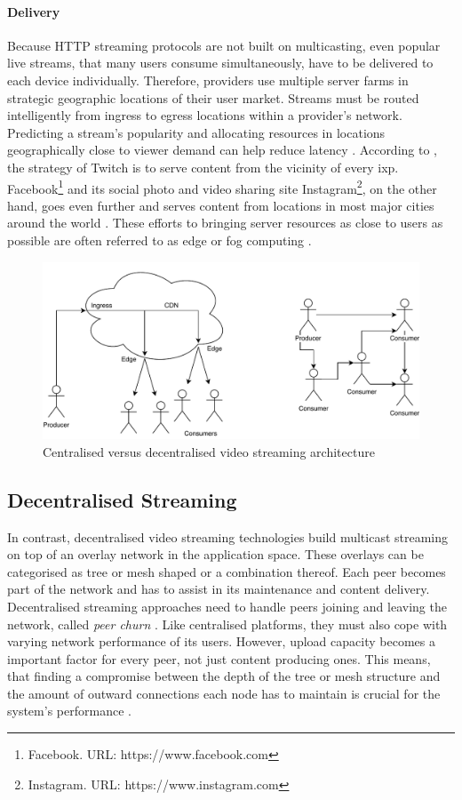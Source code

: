 \paragraph{Delivery}
Because HTTP streaming protocols are not built on multicasting, even popular live streams, that many users consume simultaneously, have to be delivered to each device individually. Therefore, providers use multiple server farms \cite[p. 738-740]{tanenbaum_wetherall_2011} in strategic geographic locations of their user market. Streams must be routed intelligently from ingress to egress locations within a provider's network. Predicting a stream's popularity and allocating resources in locations geographically close to viewer demand can help reduce latency \cite{twitch-case}. According to \citet[\S3]{twitch-case}, the strategy of Twitch is to serve content from the vicinity of every \gls{ixp}. Facebook\footnote{Facebook. URL: {https://www.facebook.com}} and its social photo and video sharing site Instagram\footnote{Instagram. URL: {https://www.instagram.com}}, on the other hand, goes even further and serves content from locations in most major cities around the world \cite{facebook-locations}. These efforts to bringing server resources as close to users as possible are often referred to as edge or fog computing \cite{fog-computing, object-store-fog-edge-ipfs}.

\begin{figure}
\centering
\includegraphics[width=.75\textwidth]{graphics/streaming-types.pdf}
\caption{Centralised versus decentralised video streaming architecture}
\label{fig:de-central-architectures}
\end{figure}

\subsection{Decentralised Streaming}

In contrast, decentralised video streaming technologies build multicast streaming on top of an overlay network in the application space. These overlays can be categorised as tree or mesh shaped or a combination thereof. Each peer becomes part of the network and has to assist in its maintenance and content delivery. Decentralised streaming approaches need to handle peers joining and leaving the network, called \textit{peer churn} \cite[\S7.5]{tanenbaum_wetherall_2011}. Like centralised platforms, they must also cope with varying network performance of its users. However, upload capacity becomes a important factor for every peer, not just content producing ones. This means, that finding a compromise between the depth of the tree or mesh structure and the amount of outward connections each node has to maintain is crucial for the system's performance \cite[\S{III.A}]{multicast-problems}.

